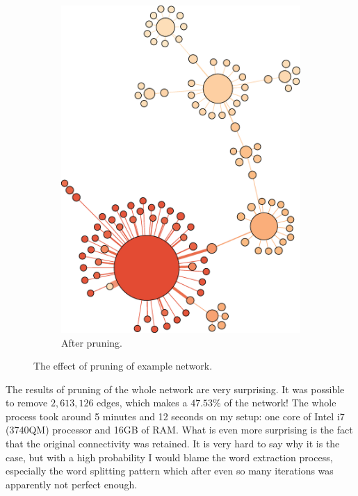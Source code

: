 \begin{figure}[H]
\begin{subfigure}[b]{0.43\textwidth}
          \includegraphics[width=\textwidth]{chapters/03_implementation/prune_2}
          \caption{After pruning.}
          \label{fig:prune_2}
        \end{subfigure}
      \caption{The effect of pruning of example network.}
      \label{fig:pruning_effect}
    \end{figure}
    
    The results of pruning of the whole network are very surprising. It was possible to remove $2,613,126$ edges, which makes a $47.53\%$ of the network! The whole process took around 5 minutes and 12 seconds on my setup: one core of Intel i7 (3740QM) processor and 16GB of RAM. What is even more surprising is the fact that the original connectivity was retained. It is very hard to say why it is the case, but with a high probability I would blame the word extraction process, especially the word splitting pattern which after even so many iterations was apparently not perfect enough.

